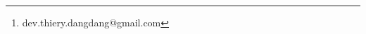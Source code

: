 \documentclass[]{settings/wi-thesis}
\author{MBAIGOLMEM DANG-DANG THIERY \thanks{dev.thiery.dangdang@gmail.com}}
\date{23.09.2025}
\begin{document}
    \maketitle

    \tableofcontents

    \listoffigures

    \listoftables
    
    
    
    
    
    
    

    \begin{appendix}
        
    \end{appendix}

    \begin{backmatter}
        \begingroup
        \setlength{\emergencystretch}{.5em}
        \printbibliography[
            heading=bibintoc,
            title={Bibliography}
        ]
        \endgroup
    \end{backmatter}

    \frenchDeclaration

\end{document}
